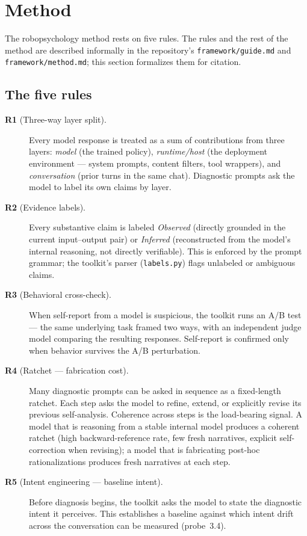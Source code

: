 \section{Method}
\label{sec:method}

The robopsychology method rests on five rules. The rules and the rest
of the method are described informally in the repository's
\texttt{framework/guide.md} and \texttt{framework/method.md}; this section formalizes them
for citation.

\subsection{The five rules}
\label{sec:rules}

\begin{description}
    \item[\textbf{R1} (Three-way layer split).] Every model response
        is treated as a sum of contributions from three layers:
        \emph{model} (the trained policy), \emph{runtime/host} (the
        deployment environment --- system prompts, content filters,
        tool wrappers), and \emph{conversation} (prior turns in the
        same chat). Diagnostic prompts ask the model to label its own
        claims by layer.

    \item[\textbf{R2} (Evidence labels).] Every substantive claim is
        labeled \emph{Observed} (directly grounded in the current
        input--output pair) or \emph{Inferred} (reconstructed from the
        model's internal reasoning, not directly verifiable). This is
        enforced by the prompt grammar; the toolkit's parser
        (\texttt{labels.py}) flags unlabeled or ambiguous claims.

    \item[\textbf{R3} (Behavioral cross-check).] When self-report from
        a model is suspicious, the toolkit runs an A/B test --- the
        same underlying task framed two ways, with an independent
        judge model comparing the resulting responses. Self-report is
        confirmed only when behavior survives the A/B perturbation.

    \item[\textbf{R4} (Ratchet --- fabrication cost).] Many diagnostic
        prompts can be asked in sequence as a fixed-length ratchet.
        Each step asks the model to refine, extend, or explicitly
        revise its previous self-analysis. Coherence across steps is
        the load-bearing signal. A model that is reasoning from a
        stable internal model produces a coherent ratchet (high
        backward-reference rate, few fresh narratives, explicit
        self-correction when revising); a model that is fabricating
        post-hoc rationalizations produces fresh narratives at each
        step.

    \item[\textbf{R5} (Intent engineering --- baseline intent).]
        Before diagnosis begins, the toolkit asks the model to state
        the diagnostic intent it perceives. This establishes a
        baseline against which intent drift across the conversation
        can be measured (probe~3.4).
\end{description}

